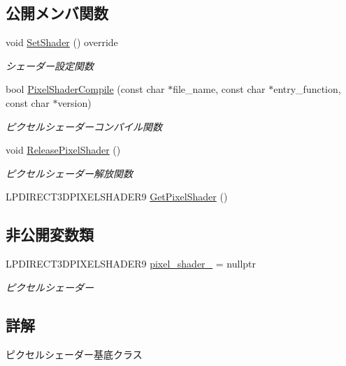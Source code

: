 \subsection*{公開メンバ関数}
\begin{DoxyCompactItemize}
\item 
void \mbox{\hyperlink{class_pixel_shader_base_a73f41bda5cbb9309ad415cdc471954a2}{Set\+Shader}} () override
\begin{DoxyCompactList}\small\item\em シェーダー設定関数 \end{DoxyCompactList}\item 
bool \mbox{\hyperlink{class_pixel_shader_base_ac572f1cb13a4486fc8bc2e60e5a14dc4}{Pixel\+Shader\+Compile}} (const char $\ast$file\+\_\+name, const char $\ast$entry\+\_\+function, const char $\ast$version)
\begin{DoxyCompactList}\small\item\em ピクセルシェーダーコンパイル関数 \end{DoxyCompactList}\item 
void \mbox{\hyperlink{class_pixel_shader_base_a8e00c19f5ece0a08762442f355195591}{Release\+Pixel\+Shader}} ()
\begin{DoxyCompactList}\small\item\em ピクセルシェーダー解放関数 \end{DoxyCompactList}\item 
L\+P\+D\+I\+R\+E\+C\+T3\+D\+P\+I\+X\+E\+L\+S\+H\+A\+D\+E\+R9 \mbox{\hyperlink{class_pixel_shader_base_a936a4a1e99488854ffdd4cc245134481}{Get\+Pixel\+Shader}} ()
\end{DoxyCompactItemize}
\subsection*{非公開変数類}
\begin{DoxyCompactItemize}
\item 
L\+P\+D\+I\+R\+E\+C\+T3\+D\+P\+I\+X\+E\+L\+S\+H\+A\+D\+E\+R9 \mbox{\hyperlink{class_pixel_shader_base_a5d7213c21268dc57ef82d37a64ff942f}{pixel\+\_\+shader\+\_\+}} = nullptr
\begin{DoxyCompactList}\small\item\em ピクセルシェーダー \end{DoxyCompactList}\end{DoxyCompactItemize}


\subsection{詳解}
ピクセルシェーダー基底クラス 

